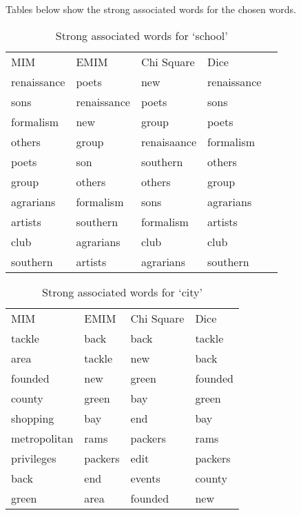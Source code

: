 \documentclass[letterpaper,11pt]{article}
\begin{document}
Tables below show the strong associated words for the chosen words.

\begin{table}[H]
\centering
\caption{Strong associated words for `school'}
\label{my-label}
\begin{tabular}{lllll}
MIM         & EMIM        & Chi Square  & Dice        &  \\
renaissance & poets       & new         & renaissance &  \\
sons        & renaissance & poets       & sons        &  \\
formalism   & new         & group       & poets       &  \\
others      & group       & renaisaance & formalism   &  \\
poets       & son         & southern    & others      &  \\
group       & others      & others      & group       &  \\
agrarians   & formalism   & sons        & agrarians   &  \\
artists     & southern    & formalism   & artists     &  \\
club        & agrarians   & club        & club        &  \\
southern    & artists     & agrarians   & southern    & 
\end{tabular}
\end{table}


\begin{table}[H]
\centering
\caption{Strong associated words for `city'}
\label{my-label}
\begin{tabular}{llll}
MIM          & EMIM    & Chi Square & Dice    \\
tackle       & back    & back       & tackle  \\
area         & tackle  & new        & back    \\
founded      & new     & green      & founded \\
county       & green   & bay        & green   \\
shopping     & bay     & end        & bay     \\
metropolitan & rams    & packers    & rams    \\
privileges   & packers & edit       & packers \\
back         & end     & events     & county  \\
green        & area    & founded    & new    
\end{tabular}
\end{table}
\end{document}
